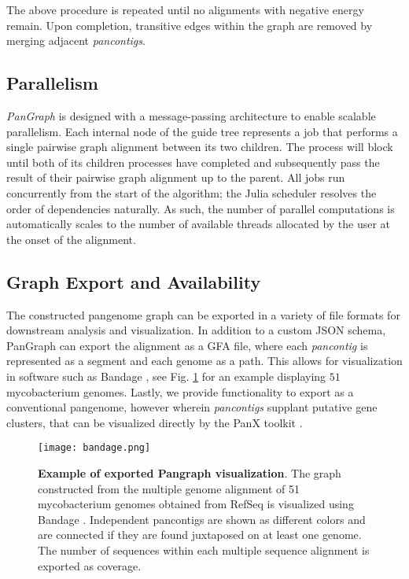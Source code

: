 \documentclass[aps,rmp,reprint,superscriptaddress,notitlepage,10pt]{revtex4-1}
\begin{document}
The above procedure is repeated until no alignments with negative energy remain.
Upon completion, transitive edges within the graph are removed by merging adjacent \emph{pancontigs}.

\subsection{Parallelism}
\emph{PanGraph} is designed with a message-passing architecture to enable scalable parallelism.
Each internal node of the guide tree represents a job that performs a single pairwise graph alignment between its two children.
The process will block until both of its children processes have completed and subsequently pass the result of their pairwise graph alignment up to the parent.
All jobs run concurrently from the start of the algorithm; the Julia scheduler resolves the order of dependencies naturally.
As such, the number of parallel computations is automatically scales to the number of available threads allocated by the user at the onset of the alignment.

\subsection{Graph Export and Availability}
The constructed pangenome graph can be exported in a variety of file formats for downstream analysis and visualization.
In addition to a custom JSON schema, PanGraph can export the alignment as a GFA file, where each \emph{pancontig} is represented as a segment and each genome as a path.
This allows for visualization in software such as Bandage \cite{wick2015bandage}, see Fig. \ref{fig:visualization} for an example displaying $51$ mycobacterium genomes.
Lastly, we provide functionality to export as a conventional pangenome, however wherein \emph{pancontigs} supplant putative gene clusters, that can be visualized directly by the PanX toolkit \cite{ding2018panx}.
\begin{figure}[htb]
    \texttt{[image: bandage.png]}
    \caption{{\bf Example of exported Pangraph visualization}.
    The graph constructed from the multiple genome alignment of 51 mycobacterium genomes obtained from RefSeq \cite{o2016reference} is visualized using Bandage \cite{wick2015bandage}.
    Independent pancontigs are shown as different colors and are connected if they are found juxtaposed on at least one genome.
    The number of sequences within each multiple sequence alignment is exported as coverage.
    }
    \label{fig:visualization}
\end{figure}
\end{document}
